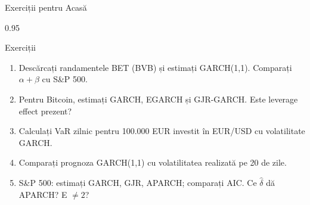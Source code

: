 \documentclass[9pt, aspectratio=169, t]{beamer}
\begin{document}
\begin{frame}{Exerciții pentru Acasă}
    \begin{cminipage}{0.95\textwidth}
    {\footnotesize
    \vspace{-2mm}
    \begin{block}{Exerciții}
        \begin{enumerate}\setlength{\itemsep}{1pt}
            \item Descărcați randamentele BET (BVB) și estimați GARCH(1,1). Comparați $\alpha + \beta$ cu S\&P 500.
            \item Pentru Bitcoin, estimați GARCH, EGARCH și GJR-GARCH. Este leverage effect prezent?
            \item Calculați VaR zilnic pentru 100.000 EUR investit în EUR/USD cu volatilitate GARCH.
            \item Comparați prognoza GARCH(1,1) cu volatilitatea realizată pe 20 de zile.
            \item S\&P 500: estimați GARCH, GJR, APARCH; comparați AIC. Ce $\hat{\delta}$ dă APARCH? E $\neq 2$?
        \end{enumerate}
    \end{block}
    }
    \end{cminipage}
\end{frame}
\end{document}
